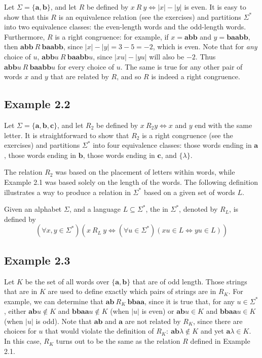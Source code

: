 Let $\Sigma=\{\pmb{a},\pmb{b}\}$, and let $R$ be defined by $x \ R\ y
\Leftrightarrow |x| - |y|$ is even. It is easy to show that this $R$ is an
equivalence relation (see the exercises) and partitions $\Sigma^*$ into two
equivalence classes: the even-length words and the odd-length words.
Furthermore, $R$ is a right congruence: for example, if $x=\pmb{abb}$ and
$y=\pmb{baabb}$, then $\pmb{abb}\ R\ \pmb{baabb}$, since $|x|-|y|=3-5= -2$, which
is even. Note that for \emph{any} choice of $u$, $\pmb{abb}u\ R\ \pmb{baabb}u$,
since $|xu|-|yu|$ will also be $-2$. Thus $\pmb{abb}u\ R\ \pmb{baabb}u$ for every
choice of $u$. The same is true for any other pair of words $x$ and $y$ that are
related by $R$, and so $R$ is indeed a right congruence.

\subsection*{Example 2.2}

Let $\Sigma=\{\pmb{a},\pmb{b},\pmb{c}\}$, and let $R_2$ be defined by
$x\ R_2 y \Leftrightarrow x$ and $y$ end with the same letter. It is
straightforward to show that $R_2$ is a right congruence (see the exercises)
and partitions $\Sigma^*$ into four equivalence classes: those words ending in
$\pmb{a}$, those words ending in $\pmb{b}$, those words ending in $\pmb{c}$, and
$\{\lambda\}$.

The relation $R_2$ was based on the placement of letters within words, while
Example 2.1 was based solely on the length of the words. The following
definition illustrates a way to produce a relation in $\Sigma^*$ based on a
given set of words $L$.

\begin{dfn}\label{dfn-2.2}
Given an alphabet $\Sigma$, and a language $L \subseteq \Sigma^*$, the
\emph{} in $\Sigma^*$, denoted by $R_L$, is
defined by
\[ (\forall x,y \in \Sigma^*)(x\ R_L\ y \Leftrightarrow (\forall u \in \Sigma^*)
	(xu \in L \Leftrightarrow yu \in L)) \]
\end{dfn}

\subsection*{Example 2.3}

Let $K$ be the set of all words over $\{\pmb{a},\pmb{b}\}$ that are of odd
length. Those strings that are in $K$ are used to define exactly which pairs of
strings are in $R_K$. For example, we can determine that $\pmb{ab}\ R_K\ 
\pmb{bbaa}$, since it is true that, for any $u \in \Sigma^*$, either
$\pmb{ab}u \not \in K$ and $\pmb{bbaa}u \not \in K$ (when $|u|$ is even) or
$\pmb{ab}u \in K$ and $\pmb{bbaa}u \in K$ (when $|u|$ is odd). Note that
$\pmb{ab}$ and $\pmb{a}$ are not related by $R_K$, since there are choices for $u$
that would violate the definition of $R_K:\ \pmb{ab}\lambda \not \in K$ and yet
$\pmb{a}\lambda \in K$. In this case, $R_K$ turns out to be the same as the
relation $R$ defined in Example 2.1.

